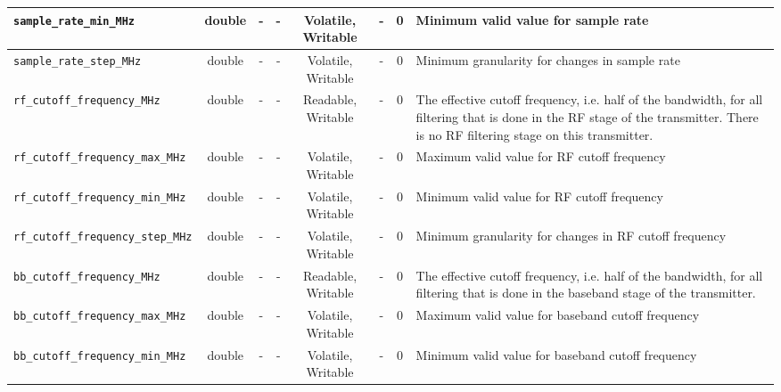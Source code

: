 \documentclass{article}
\begin{document}
\begin{landscape}
\begin{scriptsize}
\begin{tabular}{|p{4cm}|c|c|c|c|c|c|p{8cm}|}
			\hline
			\verb+sample_rate_min_MHz+          & double & -        & -          & Volatile, Writable & -           & 0       & Minimum valid value for sample rate                                                                                                         \\
			\hline
			\verb+sample_rate_step_MHz+         & double & -        & -          & Volatile, Writable & -           & 0       & Minimum granularity for changes in sample rate                                                                                              \\
			\hline
			\verb+rf_cutoff_frequency_MHz+      & double & -        & -          & Readable, Writable  & -           & 0       & The effective cutoff frequency, i.e. half of the bandwidth, for all filtering that is done in the RF stage of the transmitter. There is no RF filtering stage on this transmitter. \\
			\hline
			\verb+rf_cutoff_frequency_max_MHz+  & double & -        & -          & Volatile, Writable & -           & 0       & Maximum valid value for RF cutoff frequency                                                                                                 \\
			\hline
			\verb+rf_cutoff_frequency_min_MHz+  & double & -        & -          & Volatile, Writable & -           & 0       & Minimum valid value for RF cutoff frequency                                                                                                 \\
			\hline
			\verb+rf_cutoff_frequency_step_MHz+ & double & -        & -          & Volatile, Writable & -           & 0       & Minimum granularity for changes in RF cutoff frequency                                                                                      \\
			\hline
			\verb+bb_cutoff_frequency_MHz+      & double & -        & -          & Readable, Writable  & -           & 0       & The effective cutoff frequency, i.e. half of the bandwidth, for all filtering that is done in the baseband stage of the transmitter.                                               \\
			\hline
			\verb+bb_cutoff_frequency_max_MHz+  & double & -        & -          & Volatile, Writable & -           & 0       & Maximum valid value for baseband cutoff frequency                                                                                           \\
			\hline
			\verb+bb_cutoff_frequency_min_MHz+  & double & -        & -          & Volatile, Writable & -           & 0       & Minimum valid value for baseband cutoff frequency                                                                                           \\

\end{tabular}
\end{scriptsize}
\end{landscape}
\end{document}
